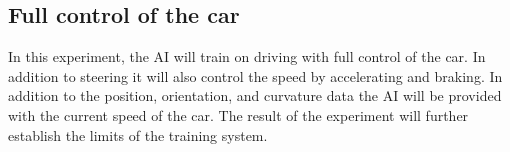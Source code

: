 




\subsection{Full control of the car}
\label{method:baseline}
In this experiment, the AI will train on driving with full control of the car. In addition to steering it will also control the speed by accelerating and braking. In addition to the position, orientation, and curvature data the AI will be provided with the current speed of the car. The result of the experiment will further establish the limits of the training system. 

